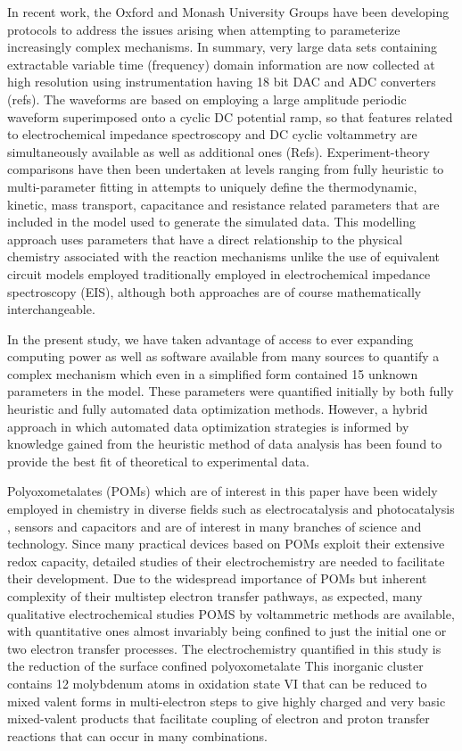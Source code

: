 \documentclass[a4paper, 12pt]{article}
\begin{document}
In recent work, the Oxford and Monash University Groups have been developing 
protocols to address the issues arising when attempting to parameterize 
increasingly complex mechanisms. In summary, very large data sets containing 
extractable variable time (frequency) domain information are now collected at 
high resolution using instrumentation having 18 bit DAC and ADC converters 
(refs). The waveforms are based on employing a large amplitude periodic waveform 
superimposed onto a cyclic DC potential ramp, so that features related to 
electrochemical impedance spectroscopy and DC cyclic voltammetry are 
simultaneously available as well as additional ones (Refs). Experiment-theory 
comparisons have then been undertaken at levels ranging from fully heuristic to 
multi-parameter fitting in attempts to uniquely define the thermodynamic, 
kinetic, mass transport, capacitance and resistance  related parameters that are 
included in the model used to generate the simulated data. This modelling 
approach uses parameters that have a direct relationship to the physical 
chemistry associated with the reaction mechanisms  unlike the use of equivalent  
circuit models employed traditionally employed in electrochemical impedance 
spectroscopy (EIS), although both approaches are of course mathematically 
interchangeable. 


In the present study, we have taken advantage of access to ever expanding 
computing power as well as software available from many sources to quantify a 
complex mechanism which even in a simplified form contained 15 unknown 
parameters in the model. These parameters were quantified initially by both 
fully heuristic and fully automated data optimization methods. However, a hybrid 
approach in which automated data optimization strategies is informed by 
knowledge gained from the heuristic method of data analysis has been found to 
provide the best fit of theoretical to experimental data. 

Polyoxometalates (POMs) which are of interest in this paper have been widely 
employed in chemistry in diverse fields such as electrocatalysis and 
photocatalysis \cite{symes2013decoupling,lee2012detailed}, sensors 
\cite{wei2014phosphomolybdic,wang2014novel} and capacitors 
\cite{bajwa2013multilayer} and are of interest in many branches of science and 
technology. Since many practical devices based on POMs exploit their extensive 
redox capacity, detailed studies of their electrochemistry are needed to 
facilitate their development.  Due to the widespread importance of POMs but  
inherent complexity of their multistep electron transfer pathways, as expected, 
many qualitative electrochemical studies POMS  by voltammetric methods are 
available,  with quantitative ones almost invariably being  confined to just the 
initial one or two  electron transfer processes. The electrochemistry quantified 
in this study is the reduction of the surface confined polyoxometalate 
 This inorganic cluster contains 12 molybdenum atoms in 
oxidation state VI that can be reduced to mixed valent forms in multi-electron 
steps to give highly charged and very basic mixed-valent products that 
facilitate coupling of electron and proton transfer reactions that can occur in 
many combinations. 
\end{document}
